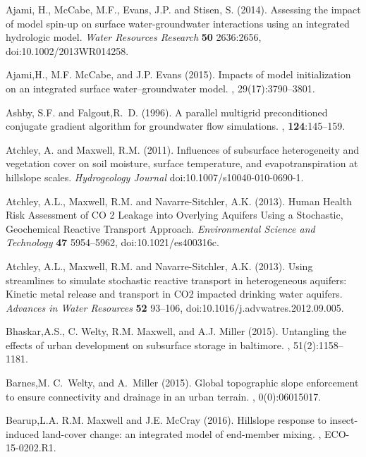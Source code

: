 \begin{thebibliography}{999}

Ajami, H., McCabe, M.F., Evans, J.P. and Stisen, S. (2014). Assessing the impact of model spin-up on surface water-groundwater interactions using an integrated hydrologic model. {\em Water Resources Research} {\bf 50} 2636:2656, doi:10.1002/2013WR014258.

Ajami,H., M.F. McCabe, and J.P. Evans (2015).
\newblock Impacts of model initialization on an integrated surface water--groundwater model.
, 29(17):3790--3801.

Ashby, S.F. and Falgout,R.~D. (1996).
\newblock A parallel multigrid preconditioned conjugate gradient algorithm for
  groundwater flow simulations.
, {\bf 124}:145--159.

Atchley, A. and Maxwell, R.M. (2011). Influences of subsurface heterogeneity and vegetation cover on soil moisture, surface temperature, and evapotranspiration at hillslope scales. {\em Hydrogeology Journal} doi:10.1007/s10040-010-0690-1.

Atchley, A.L., Maxwell, R.M. and Navarre-Sitchler, A.K. (2013). Human Health Risk Assessment of CO 2 Leakage into Overlying Aquifers Using a Stochastic, Geochemical Reactive Transport Approach. {\em Environmental Science and Technology} {\bf 47} 5954--5962, doi:10.1021/es400316c.

Atchley, A.L., Maxwell, R.M. and Navarre-Sitchler, A.K. (2013). Using streamlines to simulate stochastic reactive transport in heterogeneous aquifers: Kinetic metal release and transport in CO2 impacted drinking water aquifers. {\em Advances in Water Resources} {\bf 52} 93--106, doi:10.1016/j.advwatres.2012.09.005.

Bhaskar,A.S., C. Welty, R.M. Maxwell, and A.J. Miller (2015).
\newblock Untangling the effects of urban development on subsurface storage in
  baltimore.
, 51(2):1158--1181.


Barnes,M. C.~Welty, and A.~Miller (2015).
\newblock Global topographic slope enforcement to ensure connectivity and
  drainage in an urban terrain.
, 0(0):06015017.

Bearup,L.A. R.M. Maxwell and J.E. McCray (2016).
\newblock Hillslope response to insect-induced land-cover change: an integrated
  model of end-member mixing.
,
\newblock ECO-15-0202.R1.


\end{thebibliography}
